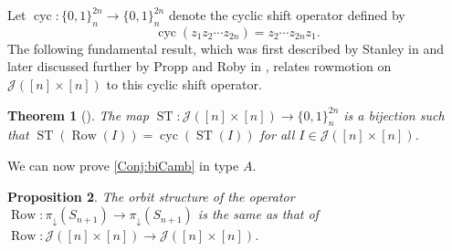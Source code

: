 \documentclass[11pt]{amsart}
\newcommand{\ST}{\operatorname{ST}}
\newcommand{\cyc}{\operatorname{cyc}}
\newtheorem{theorem}{Theorem}[section]
\newtheorem{proposition}[theorem]{Proposition}
\theoremstyle{definition}
\DeclareMathOperator{\row}{Row}
\begin{document}
Let $\cyc\colon\{0,1\}_n^{2n}\to\{0,1\}_n^{2n}$ denote the cyclic shift operator defined by \[\cyc(z_1z_2\cdots z_{2n})=z_2\cdots z_{2n}z_1.\] The following fundamental result, which was first described by Stanley in \cite{StanleyPromotion} and later discussed further by Propp and Roby in \cite{ProppRoby}, relates rowmotion on $\mathcal J([n]\times [n])$ to this cyclic shift operator. 

\begin{theorem}[{\cite[Proposition~26]{ProppRoby}}]\label{thm:Stanley-Thomas}
The map $\ST\colon\mathcal J([n]\times [n])\to\{0,1\}_n^{2n}$ is a bijection such that $\ST({\row}(I))=\cyc(\ST(I))$ for all $I\in\mathcal J([n]\times [n])$.     
\end{theorem}

We can now prove \cref{Conj:biCamb} in type $A$.

\begin{proposition}\label{thm:typeAconjecture}
    The orbit structure of the operator $\row\colon\pi_\downarrow(S_{n+1})\to \pi_\downarrow(S_{n+1})$ is the same as that of ${\row}\colon\mathcal J([n]\times[n])\to \mathcal J([n]\times[n])$. 
\end{proposition}
\end{document}
